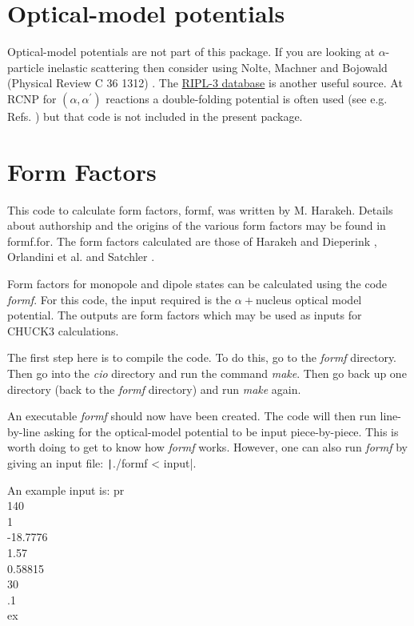 \documentclass[a4paper,10pt]{article}
\begin{document}
\section{Optical-model potentials}

Optical-model potentials are not part of this package. If you are looking at $\alpha$-particle inelastic scattering then consider using Nolte, Machner and Bojowald (Physical Review C 36 1312) \cite{dummy}. The \href{https://www-nds.iaea.org/RIPL-3/}{RIPL-3 database} is another useful source. At RCNP for $(\alpha,\alpha^\prime)$ reactions a double-folding potential is often used (see e.g. Refs. \cite{dummy}) but that code is not included in the present package.

\section{Form Factors}

This code to calculate form factors, formf, was written by M. Harakeh. Details about authorship and the origins of the various form factors may be found in formf.for. The form factors calculated are those of Harakeh and Dieperink \cite{dummy}, Orlandini et al. \cite{dummy} and Satchler \cite{dummy}.

Form factors for monopole and dipole states can be calculated using the code {\it formf}. For this code, the input required is the $\alpha+$nucleus optical model potential. The outputs are form factors which may be used as inputs for CHUCK3 calculations.

The first step here is to compile the code. To do this, go to the {\it formf} directory. Then go into the {\it cio} directory and run the command {\it make}. Then go back up one directory (back to the {\it formf} directory) and run {\it make} again.

An executable {\it formf} should now have been created. The code will then run line-by-line asking for the optical-model potential to be input piece-by-piece. This is worth doing to get to know how {\it formf} works. However, one can also run {\it formf} by giving an input file: \texttt|./formf < input|.

An example input is:
\newline
\noindent pr\\
140\\
1\\
-18.7776\\
1.57\\
0.58815\\
30\\
.1\\
ex\\
\end{document}
